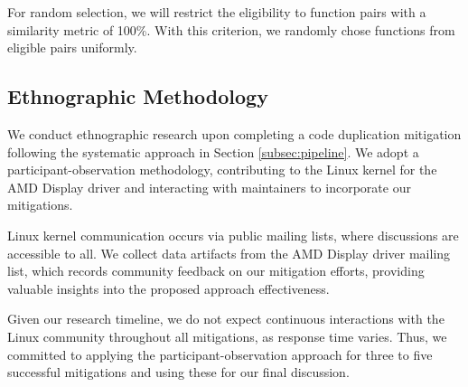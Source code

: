 For random selection, we will restrict the eligibility to function pairs with a similarity metric of 100\%. 
With this criterion, we randomly chose functions from eligible pairs uniformly.

\subsection{Ethnographic Methodology}

We conduct ethnographic research upon completing a code duplication mitigation following the systematic approach in Section \ref{subsec:pipeline}. We adopt a participant-observation methodology, contributing to the Linux kernel for the AMD Display driver and interacting with maintainers to incorporate our mitigations.

Linux kernel communication occurs via public mailing lists, where discussions are accessible to all. We collect data artifacts from the AMD Display driver mailing list, which records community feedback on our mitigation efforts, providing valuable insights into the proposed approach effectiveness.

Given our research timeline, we do not expect continuous interactions with the Linux community throughout all mitigations, as response time varies. Thus, we committed to applying the participant-observation approach for three to five successful mitigations and using these for our final discussion.
